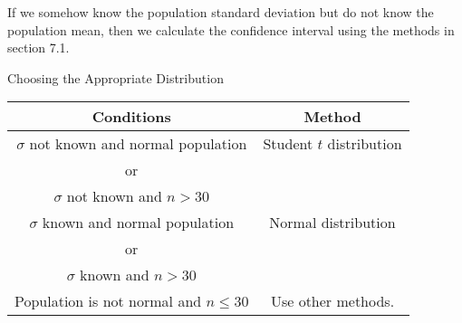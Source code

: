 \documentclass{beamer}
\begin{document}
\begin{frame}
\begin{note}
If we somehow know the population standard deviation but do not know the population mean, then we calculate the confidence interval using the methods in section 7.1.
\end{note}\pause

\begin{block}{Choosing the Appropriate Distribution}
\begin{center}
\begin{tabular}{|c|c|}\hline
\textbf{Conditions} & \textbf{Method}\\\hline
$\sigma$ not known and normal population & Student $t$ distribution\\
or&\\
$\sigma$ not known and $n>30$&\\\hline
$\sigma$ known and normal population & Normal distribution\\
or&\\
$\sigma$ known and $n>30$&\\\hline
Population is not normal and $n\leq30$ & Use other methods.\\\hline
\end{tabular}
\end{center}
\end{block}
\end{frame}
\end{document}
